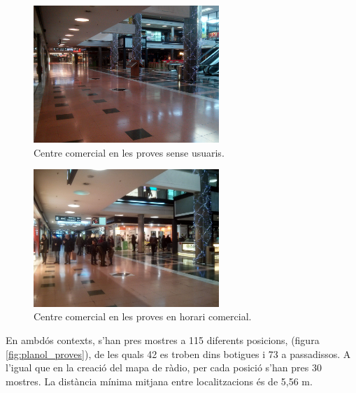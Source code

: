 \begin{figure}[ht]
\begin{center}
\includegraphics[width=7cm]{imatges/foto_buit.jpg}
\caption{Centre comercial en les proves sense usuaris.}
\label{fig:foto_buit}
\end{center}
\end{figure}

\begin{figure}[ht]
\begin{center}
\includegraphics[width=7cm]{imatges/foto_ple.jpg}
\caption{Centre comercial en les proves en horari comercial.}
\label{fig:foto_ple}
\end{center}
\end{figure}

En ambdós contexts, s'han pres mostres a 115 diferents posicions, (figura \ref{fig:planol_proves}), de les quals 42 es troben dins botigues i 73 a passadissos. A l'igual que en la creació del mapa de ràdio, per cada posició s'han pres 30 mostres. La distància mínima mitjana entre localitzacions és de 5,56 m.

